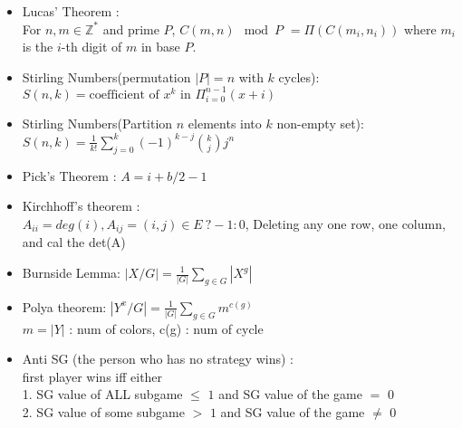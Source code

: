 \begin{itemize}
\item Lucas’ Theorem :\\
  For $n, m \in \mathbb{Z}^{*}$ and prime $P$,
  $C(m,n) \mod P$
	$= \Pi ( C(m_i,n_i) )$
	where $m_i$ is the $i$-th digit of $m$ in base $P$.
\item Stirling Numbers(permutation $|P|=n$ with $k$ cycles): \\
  $S(n,k) = \text{coefficient of }x^k \text{ in } \Pi_{i=0}^{n-1} (x+i)$
\item Stirling Numbers(Partition $n$ elements into $k$ non-empty set): \\
  $S(n,k) = \frac{1}{k!} \sum\limits_{j=0}^k (-1)^{k-j} {k \choose j} j^n$
\item Pick’s Theorem : $A = i + b/2 - 1$
\item Kirchhoff's theorem :\\
  $A_{ii} = deg(i), A_{ij} = (i,j) \in E\ ? -1 : 0$,
  Deleting any one row, one column, and cal the det(A)
\item Burnside Lemma:
  $|X/G|=\frac{1}{|G|}\sum\limits_{g \in G} {|X^g|}$
\item Polya theorem:
  $|Y^x/G|=\frac{1}{|G|}\sum\limits_{g \in G} {m^{c(g)}}$\\
  $m = |Y|$ : num of colors, c(g) : num of cycle
\item Anti SG (the person who has no strategy wins) :\\
  first player wins iff either\\
  1. SG value of ALL subgame $\le$ $1$ and SG value of the game $=$ $0$\\
  2. SG value of some subgame $>$ $1$ and SG value of the game $\neq$ $0$\\
\end{itemize}

